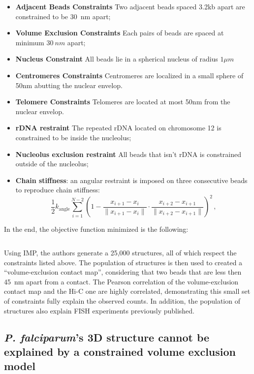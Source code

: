 \documentclass[letterpaper,12pt]{article}
\begin{document}
\begin{itemize}
\item \textbf{Adjacent Beads Constraints} Two adjacent beads spaced 3.2kb
apart are constrained to be 30~nm apart;
\item \textbf{Volume Exclusion Constraints} Each pairs of beads are spaced at
minimum $30~nm$ apart;
\item \textbf{Nucleus Constraint} All beads lie in a spherical nucleus of
radius $1\mu m$
\item \textbf{Centromeres Constraints} Centromeres are localized in a small sphere of
50nm abutting the nuclear envelop.
\item \textbf{Telomere Constraints} Telomeres are located at most 50nm from the nuclear envelop.
\item \textbf{rDNA restraint} The repeated rDNA located on chromosome 12 is
constrained to be inside the nucleolus;
\item \textbf{Nucleolus exclusion restraint} All beads that isn't rDNA is
constrained outside of the nucleolus;
\item \textbf{Chain stiffness}: an angular restraint is imposed on three
consecutive beads to reproduce chain stiffness:
\begin{equation}
\frac{1}{2} k_{\text{angle}} \sum^{N - 2}_{i = 1} \left( 1 - \frac{x_{i + 1} -
x_i}{\|x_{i + 1} - x_i\|} \cdot \frac{x_{i + 2} - x_{i + 1}}{\|x_{i + 2} -
  x_{i + 1}\|} \right)^2\,,
\end{equation}
\end{itemize}

In the end, the objective function minimized is the following:

\begin{equation}
\end{equation}

Using IMP, the authors generate a 25,000 structures, all of which respect the
constraints listed above. The population of structures is then used to created
a ``volume-exclusion contact map'', considering that two beads that are less
then 45~nm apart from a contact. The Pearson correlation of the
volume-exclusion contact map and the Hi-C one are highly correlated,
demonstrating this small set of constraints fully explain the observed counts.
In addition, the population of structures also explain FISH experiments
previously published.


\subsection*{\textit{P. falciparum}'s 3D structure cannot be explained by a
constrained volume exclusion model}
\end{document}
